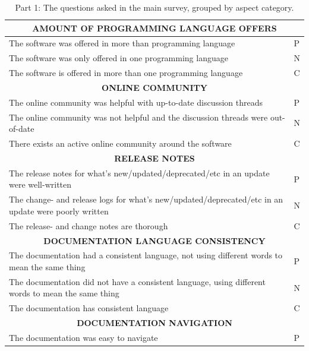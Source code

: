 \documentclass{cslthse-msc}
\begin{document}
    \begin{table}[H]
        \centering
        \caption{Part 1: The questions asked in the main survey, grouped by aspect category.}
        \label{tab:allQPart1}
        \begin{tabularx}{\columnwidth}{X|l} \hline \hline
        \multicolumn{2}{c}{\textbf{	AMOUNT OF PROGRAMMING LANGUAGE OFFERS	}} \\ \hline
        The software was offered in more than programming language	&	P		\\ \hline
        The software was only offered in one programming language	&	N		\\ \hline
        The software is offered in more than one programming language	&	C		\\ \hline \hline
        \multicolumn{2}{c}{\textbf{	ONLINE COMMUNITY	}} \\ \hline
        The online community was helpful with up-to-date discussion threads	&	P		\\ \hline
        The online community was not helpful and the discussion threads were out-of-date	&	N		\\ \hline
        There exists an active online community around the software	&	C		\\ \hline \hline
        \multicolumn{2}{c}{\textbf{	RELEASE NOTES	}} \\ \hline
        The release notes for what's new/updated/deprecated/etc in an update were well-written	&	P		\\ \hline
        The change- and release logs for what's new/updated/deprecated/etc in an update were poorly written	&	N		\\ \hline
        The release- and change notes are thorough	&	C		\\ \hline \hline
        \multicolumn{2}{c}{\textbf{	DOCUMENTATION LANGUAGE CONSISTENCY	}} \\ \hline
        The documentation had a consistent language, not using different words to mean the same thing	&	P		\\ \hline
        The documentation did not have a consistent language, using different words to mean the same thing	&	N		\\ \hline
        The documentation has consistent language	&	C		\\ \hline \hline
        \multicolumn{2}{c}{\textbf{	DOCUMENTATION NAVIGATION	}} \\ \hline
        The documentation was easy to navigate	&	P		\\ \hline

\end{tabularx}
\end{table}
\end{document}
